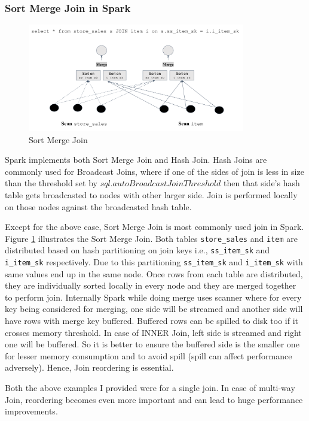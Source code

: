 \subsubsection{Sort Merge Join in Spark}\label{subsubsec:sparkjoin}

\begin{figure}[ht]
\centerline{\includegraphics[width=9.5cm]{fig/SortMergeJoin.png}}
\caption{Sort Merge Join}
\label{sort_merge_join}
\end{figure}

Spark implements both Sort Merge Join and Hash Join.
Hash Joins are commonly used for Broadcast Joins, where if one of the sides of join is less in size than the threshold set by \texttt{$sql.autoBroadcastJoinThreshold$} then that side's hash table gets broadcasted to nodes with other larger side.
Join is performed locally on those nodes against the broadcasted hash table.

Except for the above case, Sort Merge Join is most commonly used join in Spark. Figure \ref{sort_merge_join} illustrates the Sort Merge Join.
Both tables \texttt{store\_sales} and \texttt{item} are distributed based on hash partitioning on join keys i.e., \texttt{ss\_item\_sk} and \texttt{i\_item\_sk} respectively. Due to this partitioning \texttt{ss\_item\_sk}  and \texttt{i\_item\_sk} with same values end up in the same node. Once rows from each table are distributed, they are individually sorted locally in every node and they are merged together to perform join. Internally Spark while doing merge uses scanner where for every key being considered for merging, one side will be streamed and another side will have rows with merge key buffered. Buffered rows can be spilled to disk too if it crosses memory threshold. In case of INNER Join, left side is streamed and right one will be buffered. So it is better to ensure the buffered side is the smaller one for lesser memory consumption and to avoid spill (spill can affect performance adversely). Hence, Join reordering is essential.

Both the above examples I provided were for a single join. In case of multi-way Join, reordering becomes even more important and can lead to huge performance improvements.
